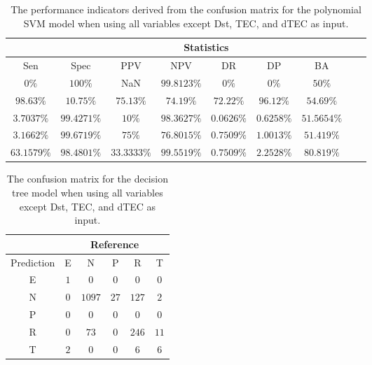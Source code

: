 \begin{table}[!ht]
	\centering
	\begin{tabular}{|c|c|c|c|c|c|c|c|c|}
		\hline
		 & \multicolumn{7}{c|}{Statistics} \\ \hline
		Sen & Spec & PPV & NPV & DR & DP & BA \\ \hline
		$0\%$ & $100\%$ & NaN & $99.8123\%$ & $0\%$ & $0\%$ & $50\%$ \\ \hline
		$98.63\%$ & $10.75\%$ & $75.13\%$ & $74.19\%$ & $72.22\%$ & $96.12\%$ & $54.69\%$ \\ \hline
		$3.7037\%$ & $99.4271\%$ & $10\%$ & $98.3627\%$ & $0.0626\%$ & $0.6258\%$ & $51.5654\%$ \\ \hline
		$3.1662\%$ & $99.6719\%$ & $75\%$ & $76.8015\%$ & $0.7509\%$ & $1.0013\%$ & $51.419\%$ \\ \hline
		$63.1579\%$ & $98.4801\%$ & $33.3333\%$ & $99.5519\%$ & $0.7509\%$ & $2.2528\%$ & $80.819\%$ \\ \hline
	\end{tabular}
	\caption{The performance indicators derived from the confusion matrix for the polynomial SVM model when using all variables except Dst, TEC, and dTEC as input.}
	\label{tab:cs:noTEC:svmPoly}
\end{table}

\begin{table}[!ht]
	\centering
	\begin{tabular}{|c|c|c|c|c|c|}
		\hline
		 & \multicolumn{5}{|c|}{Reference} \\ \hline
		 Prediction & E & N & P & R & T \\ \hline
		 E & $1$ & $0$ & $0$ & $0$ & $0$ \\ \hline
		 N & $0$ & $1097$ & $27$ & $127$ & $2$ \\ \hline
		 P & $0$ & $0$ & $0$ & $0$ & $0$ \\ \hline
		 R & $0$ & $73$ & $0$ & $246$ & $11$ \\ \hline
		 T & $2$ & $0$ & $0$ & $6$ & $6$ \\ \hline
	\end{tabular}
	\caption{The confusion matrix for the decision tree model when using all variables except Dst, TEC, and dTEC as input.}
	\label{tab:cm:noTEC:C5.0}
\end{table}

